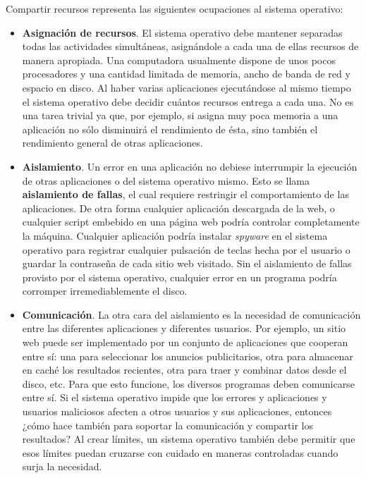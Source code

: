 \documentclass[10pt]{book}
\begin{document}
Compartir recursos representa las siguientes ocupaciones al sistema operativo:
\begin{itemize}
\item \textbf{Asignación de recursos}. El sistema operativo debe mantener separadas todas las actividades simultáneas, asignándole a cada una de ellas recursos de manera apropiada. Una computadora usualmente dispone de unos pocos procesadores y una cantidad limitada de memoria, ancho de banda de red y espacio en disco. Al haber varias aplicaciones ejecutándose al mismo tiempo el sistema operativo debe decidir cuántos recursos entrega a cada una. No es una tarea trivial ya que, por ejemplo, si asigna muy poca memoria a una aplicación no sólo disminuirá el rendimiento de ésta, sino también el rendimiento general de otras aplicaciones.

\item \textbf{Aislamiento}. Un error en una aplicación no debiese interrumpir la ejecución de otras aplicaciones o del sistema operativo mismo. Esto se llama \textbf{aislamiento de fallas}, el cual requiere restringir el comportamiento de las aplicaciones. De otra forma cualquier aplicación descargada de la web, o cualquier script embebido en una página web podría controlar completamente la máquina. Cualquier aplicación podría instalar \textit{spyware} en el sistema operativo para registrar cualquier pulsación de teclas hecha por el usuario o guardar la contraseña de cada sitio web visitado. Sin el aislamiento de fallas provisto por el sistema operativo, cualquier error en un programa podría corromper irremediablemente el disco.

\item \textbf{Comunicación}. La otra cara del aislamiento es la necesidad de comunicación entre las diferentes aplicaciones y diferentes usuarios. Por ejemplo, un sitio web puede ser implementado por un conjunto de aplicaciones que cooperan entre sí: una para seleccionar los anuncios publicitarios, otra para almacenar en caché los resultados recientes, otra para traer y combinar datos desde el disco, etc. Para que esto funcione, los diversos programas deben comunicarse entre sí. Si el sistema operativo impide que los errores y aplicaciones y usuarios maliciosos afecten a otros usuarios y sus aplicaciones, entonces ¿cómo hace también para soportar la comunicación y compartir los resultados? Al crear límites, un sistema operativo también debe permitir que esos límites puedan cruzarse con cuidado en maneras controladas cuando surja la necesidad.
\end{itemize}
\end{document}
